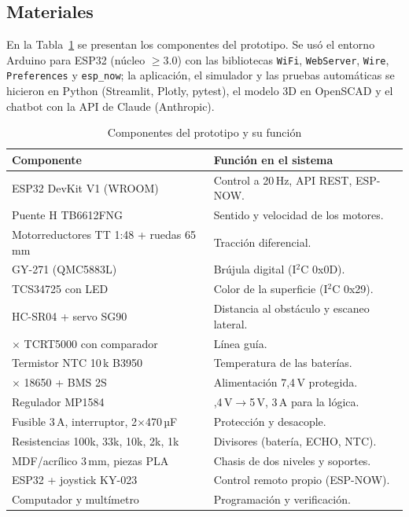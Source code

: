 \documentclass[10pt,a4paper,twocolumn]{article}
\newcommand{\ra}{$\rightarrow$}
\begin{document}
\subsection{Materiales}
En la Tabla~\ref{tab:materiales} se presentan los componentes del prototipo. Se usó el entorno Arduino para ESP32 (núcleo $\geq3.0$) con las bibliotecas \texttt{WiFi}, \texttt{WebServer}, \texttt{Wire}, \texttt{Preferences} y \texttt{esp\_now}; la aplicación, el simulador y las pruebas automáticas se hicieron en Python (Streamlit, Plotly, pytest), el modelo 3D en OpenSCAD y el chatbot con la API de Claude (Anthropic).

\begin{table}[!t]
\caption{Componentes del prototipo y su función}\label{tab:materiales}
\centering\scriptsize
\begin{tabularx}{\columnwidth}{@{}>{\raggedright\arraybackslash}p{3.3cm}>{\raggedright\arraybackslash}X@{}}
\toprule
\textbf{Componente} & \textbf{Función en el sistema}\\
\midrule
ESP32 DevKit V1 (WROOM) & Control a 20\,Hz, API REST, ESP-NOW.\\
Puente H TB6612FNG & Sentido y velocidad de los motores.\\
Motorreductores TT 1:48 + ruedas 65\,mm & Tracción diferencial.\\
GY-271 (QMC5883L) & Brújula digital (I$^2$C 0x0D).\\
TCS34725 con LED & Color de la superficie (I$^2$C 0x29).\\
HC-SR04 + servo SG90 & Distancia al obstáculo y escaneo lateral.\\
3$\times$ TCRT5000 con comparador & Línea guía.\\
Termistor NTC 10\,k B3950 & Temperatura de las baterías.\\
2$\times$ 18650 + BMS 2S & Alimentación 7,4\,V protegida.\\
Regulador MP1584 & 7,4\,V\ra5\,V, 3\,A para la lógica.\\
Fusible 3\,A, interruptor, 2$\times$470\,µF & Protección y desacople.\\
Resistencias 100k, 33k, 10k, 2k, 1k & Divisores (batería, ECHO, NTC).\\
MDF/acrílico 3\,mm, piezas PLA & Chasis de dos niveles y soportes.\\
ESP32 + joystick KY-023 & Control remoto propio (ESP-NOW).\\
Computador y multímetro & Programación y verificación.\\
\bottomrule
\end{tabularx}
\end{table}
\end{document}
